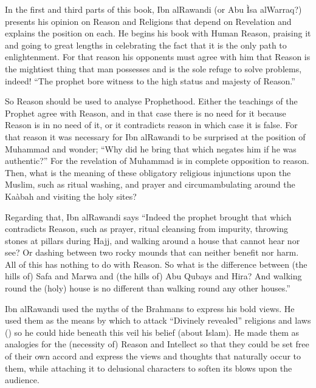 \documentclass[12pt]{memoir}
\begin{document}

In the first and third parts of this book, Ibn al\–Rawandi
(or Abu \`Isa al\–Warraq?) presents his opinion
on Reason and Religions that depend on Revelation
and explains the position on each.
He begins his book with Human Reason,
praising it and going to great lengths in celebrating the fact that it is the
only path to enlightenment. For that reason his opponents must agree with him
that Reason is the mightiest thing that man possesses and is the sole refuge to
solve problems, indeed! “The prophet bore witness to the high status and
majesty of Reason.”\fnmark


So Reason should be used to analyse Prophethood. Either the teachings of the
Prophet agree with Reason, and in that case there is no need for it because
Reason is in no need of it, or it contradicts reason in which case it is false.
For that reason it was necessary for Ibn al\–Rawandi to be surprised
at the position of Muhammad and wonder;
“Why did he bring that which negates him
if he was authentic?”\fnmark\@
For the revelation of Muhammad is in complete opposition to reason.
Then, what is the meaning of these obligatory religious
injunctions upon the Muslim, such as ritual washing, and prayer and
circumambulating around the Ka\`abah and visiting the holy sites?


Regarding that, Ibn al\–Rawandi says “Indeed the prophet brought that which
contradicts Reason, such as prayer, ritual cleansing from impurity, throwing
stones at pillars during Hajj, and walking around a house that cannot hear nor
see? Or dashing between two rocky mounds that can neither benefit nor harm. All
of this has nothing to do with Reason. So what is the difference between (the
hills of) Safa and Marwa and (the hills of) Abu Qubays and Hira? And walking
round the (holy) house is no different than walking round any other
houses.”\fnmark


Ibn al\–Rawandi used the myths of the Brahmans to express his bold views.
He used them as the means by which to attack
“Divinely revealed” religions and laws
()
so he could hide beneath this veil his belief (about Islam).
He made them as
analogies for the (necessity of) Reason and Intellect so that they could be set
free of their own accord and express the views and thoughts that naturally
occur to them, while attaching it to delusional characters to soften its blows
upon the audience.
\end{document}
